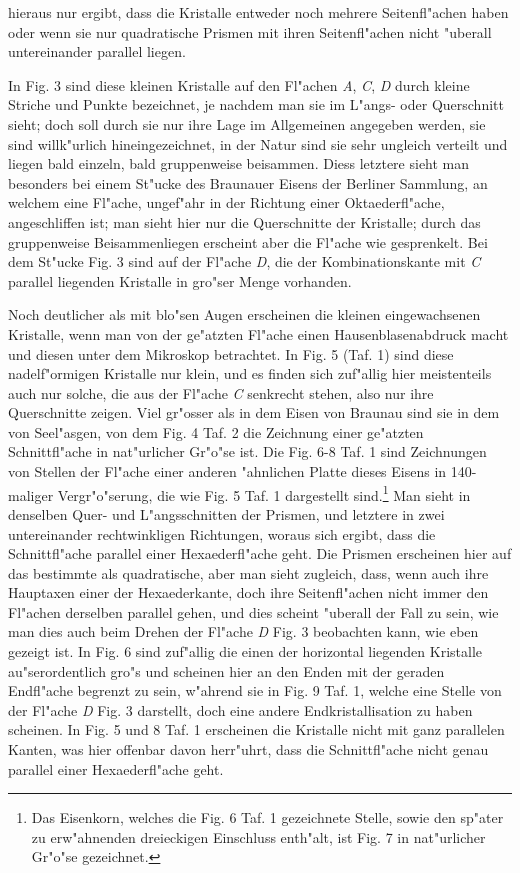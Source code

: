 \documentclass[a4paper, 11pt, oneside, german]{article}
\begin{document}
hieraus nur ergibt, dass die Kristalle entweder noch mehrere Seitenfl"achen haben oder wenn sie nur quadratische Prismen mit ihren Seitenfl"achen nicht "uberall untereinander parallel liegen.

In Fig. 3 sind diese kleinen Kristalle auf den Fl"achen \emph{A}, \emph{C}, \emph{D} durch kleine Striche und Punkte bezeichnet, je nachdem man sie im L"angs- oder Querschnitt sieht; doch soll durch sie nur ihre Lage im Allgemeinen angegeben werden, sie sind willk"urlich hineingezeichnet, in der Natur sind sie sehr ungleich verteilt und liegen bald einzeln, bald gruppenweise beisammen. Diess letztere sieht man besonders bei einem St"ucke des Braunauer Eisens der Berliner Sammlung, an welchem eine Fl"ache, ungef"ahr in der Richtung einer Oktaederfl"ache, angeschliffen ist; man sieht hier nur die Querschnitte der Kristalle; durch das gruppenweise Beisammenliegen erscheint aber die Fl"ache wie gesprenkelt. Bei dem St"ucke Fig. 3 sind auf der Fl"ache \emph{D}, die der Kombinationskante mit \emph{C} parallel liegenden Kristalle in gro"ser Menge vorhanden.

Noch deutlicher als mit blo"sen Augen erscheinen die kleinen eingewachsenen Kristalle, wenn man von der ge"atzten Fl"ache einen Hausenblasenabdruck macht und diesen unter dem Mikroskop betrachtet. In Fig. 5 (Taf. 1) sind diese nadelf"ormigen Kristalle nur klein, und es finden sich zuf"allig hier meistenteils auch nur solche, die aus der Fl"ache \emph{C} senkrecht stehen, also nur ihre Querschnitte zeigen. Viel gr"osser als in dem Eisen von Braunau sind sie in dem von Seel"asgen, von dem Fig. 4 Taf. 2 die Zeichnung einer ge"atzten Schnittfl"ache in nat"urlicher Gr"o"se ist. Die Fig. 6-8 Taf. 1 sind Zeichnungen von Stellen der Fl"ache einer anderen "ahnlichen Platte dieses Eisens in 140-maliger Vergr"o"serung, die wie Fig. 5 Taf. 1 dargestellt sind.\footnote{Das Eisenkorn, welches die Fig. 6 Taf. 1 gezeichnete Stelle, sowie den sp"ater zu erw"ahnenden dreieckigen Einschluss enth"alt, ist Fig. 7 in nat"urlicher Gr"o"se gezeichnet.} Man sieht in denselben Quer- und L"angsschnitten der Prismen, und letztere in zwei untereinander rechtwinkligen Richtungen, woraus sich ergibt, dass die Schnittfl"ache parallel einer Hexaederfl"ache geht. Die Prismen erscheinen hier auf das bestimmte als quadratische, aber man sieht zugleich, dass, wenn auch ihre Hauptaxen einer der Hexaederkante, doch ihre Seitenfl"achen nicht immer den Fl"achen derselben parallel gehen, und dies scheint "uberall der Fall zu sein, wie man dies auch beim Drehen der Fl"ache \emph{D} Fig. 3 beobachten kann, wie eben gezeigt ist. In Fig. 6 sind zuf"allig die einen der horizontal liegenden Kristalle au"serordentlich gro"s und scheinen hier an den Enden mit der geraden Endfl"ache begrenzt zu sein, w"ahrend sie in Fig. 9 Taf. 1, welche eine Stelle von der Fl"ache \emph{D} Fig. 3 darstellt, doch eine andere Endkristallisation zu haben scheinen. In Fig. 5 und 8 Taf. 1 erscheinen die Kristalle nicht mit ganz parallelen Kanten, was hier offenbar davon herr"uhrt, dass die Schnittfl"ache nicht genau parallel einer Hexaederfl"ache geht.
\end{document}
